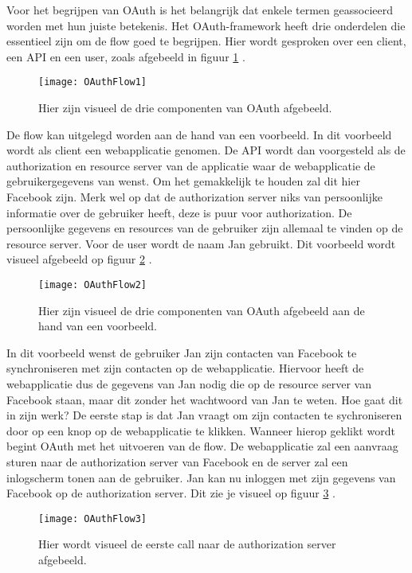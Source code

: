 Voor het begrijpen van OAuth is het belangrijk dat enkele termen geassocieerd worden met hun juiste betekenis. Het OAuth-framework heeft drie onderdelen die essentieel zijn om de flow goed te begrijpen. Hier wordt gesproken over een client, een API en een user, zoals afgebeeld in figuur \ref{fig:oauth1} \autocite{Services2016}.
\begin{figure}[H]
	\centering
	\texttt{[image: OAuthFlow1]} 
	\caption[Visueel de drie componenten]{Hier zijn visueel de drie componenten van OAuth afgebeeld.}
	\label{fig:oauth1}
\end{figure}
De flow kan uitgelegd worden aan de hand van een voorbeeld. In dit voorbeeld wordt als client een webapplicatie genomen. De API wordt dan voorgesteld als de authorization en resource server van de applicatie waar de webapplicatie de gebruikergegevens van wenst. Om het gemakkelijk te houden zal dit hier Facebook zijn. Merk wel op dat de authorization server niks van persoonlijke informatie over de gebruiker heeft, deze is puur voor authorization. De persoonlijke gegevens en resources van de gebruiker zijn allemaal te vinden op de resource server. Voor de user wordt de naam Jan gebruikt. Dit voorbeeld wordt visueel afgebeeld op figuur \ref{fig:oauth2} \autocite{Deniss2016} \autocite{Services2016}.
\begin{figure}[H]
	\centering
	\texttt{[image: OAuthFlow2]} 
	\caption[De drie componenten aan de hand van een voorbeeld]{Hier zijn visueel de drie componenten van OAuth afgebeeld aan de hand van een voorbeeld.}
	\label{fig:oauth2}
\end{figure}
In dit voorbeeld wenst de gebruiker Jan zijn contacten van Facebook te synchroniseren met zijn contacten op de webapplicatie. Hiervoor heeft de webapplicatie dus de gegevens van Jan nodig die op de resource server van Facebook staan, maar dit zonder het wachtwoord van Jan te weten. Hoe gaat dit in zijn werk?
De eerste stap is dat Jan vraagt om zijn contacten te sychroniseren door op een knop op de webapplicatie te klikken. Wanneer hierop geklikt wordt begint OAuth met het uitvoeren van de flow. De webapplicatie zal een aanvraag sturen naar de authorization server van Facebook en de server zal een inlogscherm tonen aan de gebruiker. Jan kan nu inloggen met zijn gegevens van Facebook op de authorization server. Dit zie je visueel op figuur \ref{fig:oauth3} \autocite{Services2016} \autocite{OktaDev2018}.
\begin{figure}[H]
	\centering
	\texttt{[image: OAuthFlow3]} 
	\caption[Eerste call naar de authorization server]{Hier wordt visueel de eerste call naar de authorization server afgebeeld.}
	\label{fig:oauth3}
\end{figure}

